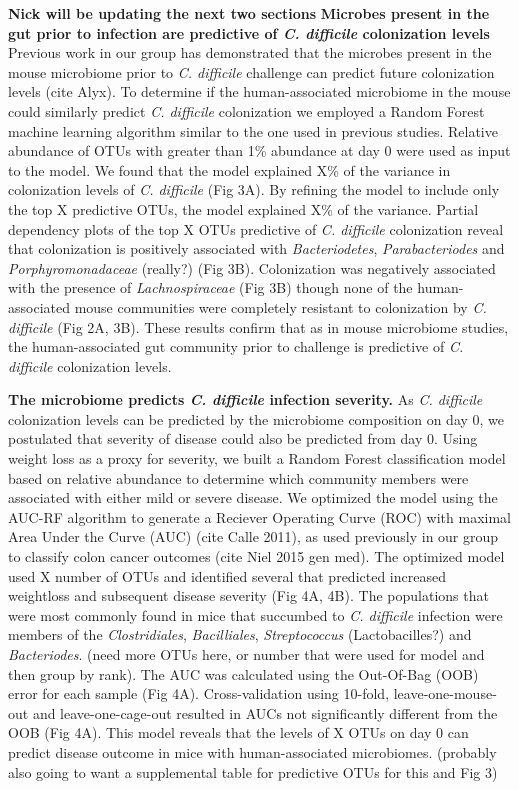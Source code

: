 \documentclass[11pt,]{article}
\begin{document}
\textbf{Nick will be updating the next two sections} \textbf{Microbes
present in the gut prior to infection are predictive of \emph{C.
difficile} colonization levels} Previous work in our group has
demonstrated that the microbes present in the mouse microbiome prior to
\emph{C. difficile} challenge can predict future colonization levels
(cite Alyx). To determine if the human-associated microbiome in the
mouse could similarly predict \emph{C. difficile} colonization we
employed a Random Forest machine learning algorithm similar to the one
used in previous studies. Relative abundance of OTUs with greater than
1\% abundance at day 0 were used as input to the model. We found that
the model explained X\% of the variance in colonization levels of
\emph{C. difficile} (Fig 3A). By refining the model to include only the
top X predictive OTUs, the model explained X\% of the variance. Partial
dependency plots of the top X OTUs predictive of \emph{C. difficile}
colonization reveal that colonization is positively associated with
\emph{Bacteriodetes}, \emph{Parabacteriodes} and
\emph{Porphyromonadaceae} (really?) (Fig 3B). Colonization was
negatively associated with the presence of \emph{Lachnospiraceae} (Fig
3B) though none of the human-associated mouse communities were
completely resistant to colonization by \emph{C. difficile} (Fig 2A,
3B). These results confirm that as in mouse microbiome studies, the
human-associated gut community prior to challenge is predictive of
\emph{C. difficile} colonization levels.

\textbf{The microbiome predicts \emph{C. difficile} infection severity.}
As \emph{C. difficile} colonization levels can be predicted by the
microbiome composition on day 0, we postulated that severity of disease
could also be predicted from day 0. Using weight loss as a proxy for
severity, we built a Random Forest classification model based on
relative abundance to determine which community members were associated
with either mild or severe disease. We optimized the model using the
AUC-RF algorithm to generate a Reciever Operating Curve (ROC) with
maximal Area Under the Curve (AUC) (cite Calle 2011), as used previously
in our group to classify colon cancer outcomes (cite Niel 2015 gen med).
The optimized model used X number of OTUs and identified several that
predicted increased weightloss and subsequent disease severity (Fig 4A,
4B). The populations that were most commonly found in mice that
succumbed to \emph{C. difficile} infection were members of the
\emph{Clostridiales}, \emph{Bacilliales}, \emph{Streptococcus}
(Lactobacilles?) and \emph{Bacteriodes}. (need more OTUs here, or number
that were used for model and then group by rank). The AUC was calculated
using the Out-Of-Bag (OOB) error for each sample (Fig 4A).
Cross-validation using 10-fold, leave-one-mouse-out and
leave-one-cage-out resulted in AUCs not significantly different from the
OOB (Fig 4A). This model reveals that the levels of X OTUs on day 0 can
predict disease outcome in mice with human-associated microbiomes.
(probably also going to want a supplemental table for predictive OTUs
for this and Fig 3)
\end{document}
